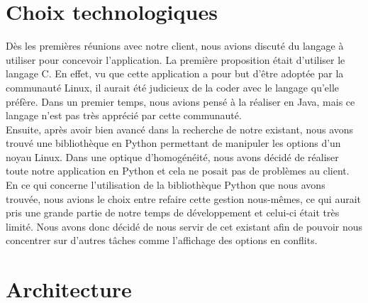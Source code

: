 \documentclass[16pts]{report}
\begin{document}
    \section{Choix technologiques}
    \label{sub:Choix technologiques}

Dès les premières réunions avec notre client, nous avions discuté du langage à 
utiliser pour concevoir l'application. La première proposition était d'utiliser 
le langage C. En effet, vu que cette application a pour but d'être adoptée par 
la communauté Linux, il aurait été judicieux de la coder avec le langage 
qu'elle préfère. Dans un premier temps, nous avions pensé à la réaliser
en Java, mais ce langage n'est pas très apprécié par cette communauté.
\\

Ensuite, après avoir bien avancé dans la recherche de notre existant, nous 
avons trouvé une bibliothèque en Python permettant de manipuler les options 
d'un noyau Linux. Dans une optique d'homogénéité, nous avons décidé de réaliser 
toute notre application en Python et cela ne posait pas de problèmes au client.
\\

En ce qui concerne l'utilisation de la bibliothèque Python que nous avons 
trouvée, nous avions le choix entre refaire cette gestion nous-mêmes, ce qui 
aurait pris une grande partie de notre temps de développement et celui-ci 
était très limité. Nous avons donc décidé de nous servir de cet existant 
afin de pouvoir nous concentrer sur d'autres tâches comme l'affichage 
des options en conflits.


    \section{Architecture}
    \label{sub:Architecture}
\end{document}
